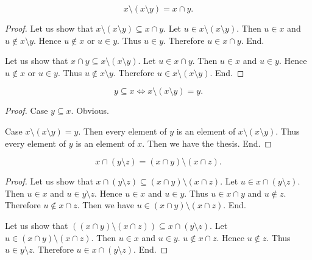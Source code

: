 \documentclass[../../sets-and-functions.ftl.tex]{subfiles}
\begin{document}
\begin{forthel}
    \begin{proposition}\label{SetTheory_01_01_408438}
      \[ x \setminus (x \setminus y) = x \cap y. \]
    \end{proposition}
    \begin{proof}
      Let us show that $x \setminus (x \setminus y) \subseteq x \cap y$.
        Let $u \in x \setminus (x \setminus y)$.
        Then $u \in x$ and $u \notin x \setminus y$.
        Hence $u \notin x$ or $u \in y$.
        Thus $u \in y$.
        Therefore $u \in x \cap y$.
      End.

      Let us show that $x \cap y \subseteq x \setminus (x \setminus y)$.
        Let $u \in x \cap y$.
        Then $u \in x$ and $u \in y$.
        Hence $u \notin x$ or $u \in y$.
        Thus $u \notin x \setminus y$.
        Therefore $u \in x \setminus (x \setminus y)$.
      End.
    \end{proof}


    \begin{proposition}\label{SetTheory_01_01_185130}
      \[ y \subseteq x \iff x \setminus (x \setminus y) = y. \]
    \end{proposition}
    \begin{proof}
      Case $y \subseteq x$. Obvious.

      Case $x \setminus (x \setminus y) = y$.
        Then every element of $y$ is an element of $x \setminus
        (x \setminus y)$.
        Thus every element of $y$ is an element of $x$.
        Then we have the thesis.
      End.
    \end{proof}


    \begin{proposition}\label{SetTheory_01_01_878796}
      \[ x \cap (y \setminus z) = (x \cap y) \setminus (x \cap z). \]
    \end{proposition}
    \begin{proof}
      Let us show that $x \cap (y \setminus z) \subseteq (x \cap y) \setminus (x \cap z)$.
        Let $u \in x \cap (y \setminus z)$.
        Then $u \in x$ and $u \in y \setminus z$.
        Hence $u \in x$ and $u \in y$.
        Thus $u \in x \cap y$ and $u \notin z$.
        Therefore $u \notin x \cap z$.
        Then we have $u \in (x \cap y) \setminus (x \cap z)$.
      End.

      Let us show that $((x \cap y) \setminus (x \cap z)) \subseteq x \cap (y \setminus z)$.
        Let $u \in (x \cap y) \setminus (x \cap z)$.
        Then $u \in x$ and $u \in y$.
        $u \notin x \cap z$.
        Hence $u \notin z$.
        Thus $u \in y \setminus z$.
        Therefore $u \in x \cap (y \setminus z)$.
      End.
    \end{proof}
  \end{forthel}
\end{document}
